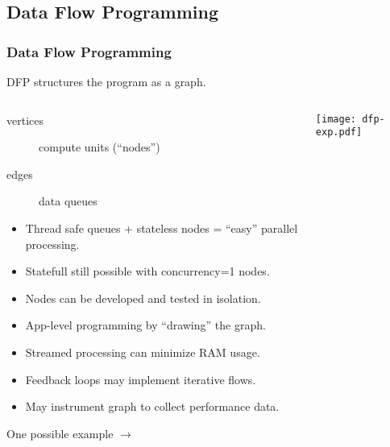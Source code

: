 \documentclass[xcolor=dvipsnames]{beamer}
\begin{document}
\subsection{Data Flow Programming}

\begin{frame}
  \frametitle{Data Flow Programming}
  \footnotesize
  DFP structures the program as a graph.
  \vspace{-4mm}
  \begin{columns}
    \begin{column}{0.8\textwidth}
      \begin{description}
      \item[vertices] compute units (``nodes'')
      \item[edges] data queues
      \end{description}

      \begin{itemize}
      \item Thread safe queues + stateless nodes = ``easy'' parallel processing.
      \item Statefull still possible with concurrency=1 nodes.
      \item Nodes can be developed and tested in isolation.
      \item App-level programming by ``drawing'' the graph.
      \item Streamed processing can minimize RAM usage.
      \item Feedback loops may implement iterative flows.
      \item May instrument graph to collect performance data.
      \end{itemize}
      \flushright One possible example $\rightarrow$
    \end{column}

    \begin{column}{0.25\textwidth}
      \texttt{[image: dfp-exp.pdf]}
    \end{column}
  \end{columns}
\end{frame}
\end{document}
